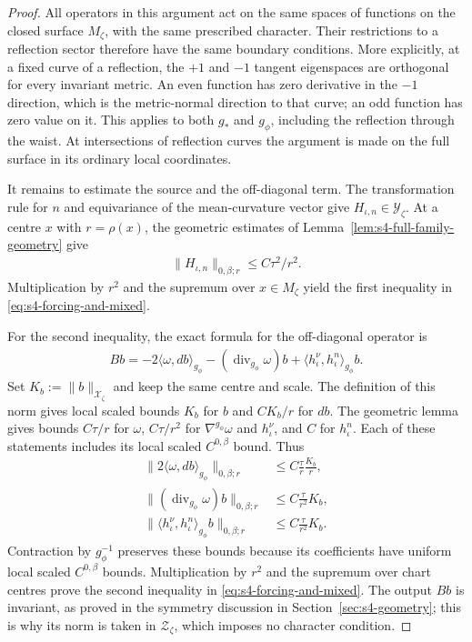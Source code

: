 \documentclass[a4paper,11pt,oneside,reqno]{amsart}
\numberwithin{equation}{section}
\theoremstyle{definition}
\begin{document}
\begin{proof}
    All operators in this argument act on the same
    spaces of functions on the closed surface $M_\zeta$,
    with the same prescribed character. Their restrictions
    to a reflection sector therefore have the same
    boundary conditions. More explicitly, at a fixed
    curve of a reflection, the $+1$ and $-1$ tangent
    eigenspaces are orthogonal for every invariant metric.
    An even function has zero derivative in the $-1$
    direction, which is the metric-normal direction to
    that curve; an odd function has zero value on it.
    This applies to both $g_*$ and $g_\phi$, including
    the reflection through the waist. At intersections
    of reflection curves the argument is made on the
    full surface in its ordinary local coordinates.

    It remains to estimate the source and the
    off-diagonal term. The transformation rule for $n$
    and equivariance of the mean-curvature vector give
    $H_{\iota,n}\in\mathcal Y_\zeta$.
    At a centre $x$ with $r=\rho(x)$, the geometric
    estimates of Lemma~\ref{lem:s4-full-family-geometry}
    give
    \begin{align*}
        \|H_{\iota,n}\|_{0,\beta;r}
        \leq C\tau^2/r^2.
    \end{align*}
    Multiplication by $r^2$ and the supremum over
    $x\in M_\zeta$ yield the first inequality in
    \eqref{eq:s4-forcing-and-mixed}.

    For the second inequality, the exact formula for
    the off-diagonal operator is
    \begin{align*}
        Bb=-2\langle\omega,db\rangle_{g_\phi}
        -(\operatorname{div}_{g_\phi}\omega)b
        +\langle h_\iota^\nu,h_\iota^n\rangle_{g_\phi}b.
    \end{align*}
    Set $K_b:=\|b\|_{\mathcal X_\zeta}$ and keep the
    same centre and scale. The definition of this norm
    gives local scaled bounds $K_b$ for $b$ and
    $CK_b/r$ for $db$. The geometric lemma gives
    bounds $C\tau/r$ for $\omega$,
    $C\tau/r^2$ for $\nabla^{g_\phi}\omega$ and
    $h_\iota^\nu$, and $C$ for $h_\iota^n$.
    Each of these statements includes its local scaled
    $C^{0,\beta}$ bound. Thus
    \begin{align*}
        \|2\langle\omega,db\rangle_{g_\phi}
        \|_{0,\beta;r}
        &\leq C\frac\tau r\frac{K_b}r,\\
        \|(\operatorname{div}_{g_\phi}\omega)b
        \|_{0,\beta;r}
        &\leq C\frac\tau{r^2}K_b,\\
        \|\langle h_\iota^\nu,h_\iota^n\rangle_{g_\phi}b
        \|_{0,\beta;r}
        &\leq C\frac\tau{r^2}K_b.
    \end{align*}
    Contraction by $g_\phi^{-1}$ preserves these bounds
    because its coefficients have uniform local scaled
    $C^{0,\beta}$ bounds. Multiplication by $r^2$
    and the supremum over chart centres prove the
    second inequality in \eqref{eq:s4-forcing-and-mixed}.
    The output $Bb$ is invariant, as proved in the
    symmetry discussion in Section~\ref{sec:s4-geometry};
    this is why its norm is taken in $\mathcal Z_\zeta$,
    which imposes no character condition.
\end{proof}
\end{document}
